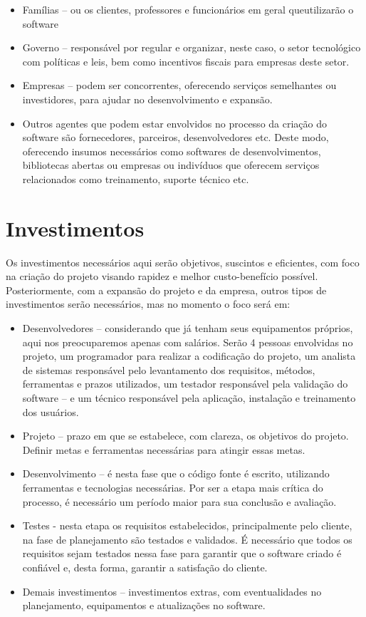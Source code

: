 \documentclass[
	12pt,				%
	openright,			%
	twoside,			%
	a4paper,			%
	english,			%
	french,				%
	spanish,			%
	brazil				%
	]{abntex2}
\begin{document}
\begin{itemize}
    \item Famílias – ou os clientes, professores e funcionários em geral queutilizarão
	o software
    \item Governo – responsável por regular e organizar, neste caso, o setor
	tecnológico com políticas e leis, bem como incentivos fiscais para empresas
	deste setor.
    \item Empresas – podem ser concorrentes, oferecendo serviços semelhantes ou
	investidores, para ajudar no desenvolvimento e expansão.
	\item Outros agentes que podem estar envolvidos no processo da criação do
	software são fornecedores, parceiros, desenvolvedores etc. Deste modo,
	oferecendo insumos necessários como softwares de desenvolvimentos, bibliotecas abertas ou empresas ou indivíduos que oferecem serviços
	relacionados como treinamento, suporte técnico etc.
\end{itemize}

\section{Investimentos}

Os investimentos necessários aqui serão objetivos, suscintos e eficientes, com
foco na criação do projeto visando rapidez e melhor custo-benefício possível.
Posteriormente, com a expansão do projeto e da empresa, outros tipos de
investimentos serão necessários, mas no momento o foco será em:

\begin{itemize}
	\item Desenvolvedores – considerando que já tenham seus equipamentos
	próprios, aqui nos preocuparemos apenas com salários. Serão 4 pessoas
	envolvidas no projeto, um programador para realizar a codificação do projeto,
	um analista de sistemas responsável pelo levantamento dos requisitos,
	métodos, ferramentas e prazos utilizados, um testador responsável pela
	validação do software – e um técnico responsável pela aplicação, instalação
	e treinamento dos usuários.
	\item Projeto – prazo em que se estabelece, com clareza, os objetivos do projeto.
	Definir metas e ferramentas necessárias para atingir essas metas.
	\item Desenvolvimento – é nesta fase que o código fonte é escrito, utilizando
	ferramentas e tecnologias necessárias. Por ser a etapa mais crítica do
	processo, é necessário um período maior para sua conclusão e avaliação.
	\item Testes - nesta etapa os requisitos estabelecidos, principalmente pelo cliente,
	na fase de planejamento são testados e validados. É necessário que todos
	os requisitos sejam testados nessa fase para garantir que o software criado
	é confiável e, desta forma, garantir a satisfação do cliente.
	\item Demais investimentos – investimentos extras, com eventualidades no
	planejamento, equipamentos e atualizações no software.
\end{itemize}
\end{document}
